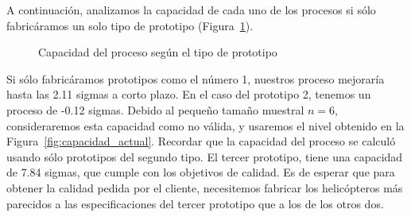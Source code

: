 \documentclass[12pt,a4paper,twoside,openright,titlepage,final]{article}
\begin{document}
A continuación, analizamos la capacidad de cada uno de los procesos si sólo fabricáramos un solo tipo de prototipo (Figura~\ref{fig:capacidad_prototipos}).\\

\begin{figure}[htbp!]
	\centering
	\caption{Capacidad del proceso según el tipo de prototipo} \label{fig:capacidad_prototipos}
\end{figure}

Si sólo fabricáramos prototipos como el número 1, nuestros proceso mejoraría hasta las 2.11 sigmas a corto plazo. En el caso del prototipo 2, tenemos un proceso de -0.12 sigmas. Debido al pequeño tamaño muestral $n=6$, consideraremos esta capacidad como no válida, y usaremos el nivel obtenido en la Figura~\ref{fig:capacidad_actual}. Recordar que la capacidad del proceso se calculó usando sólo prototipos del segundo tipo. El tercer prototipo, tiene una capacidad de 7.84 sigmas, que cumple con los objetivos de calidad. Es de esperar que para obtener la calidad pedida por el cliente, necesitemos fabricar los helicópteros más parecidos a las especificaciones del tercer prototipo que a los de los otros dos. \\
\end{document}
